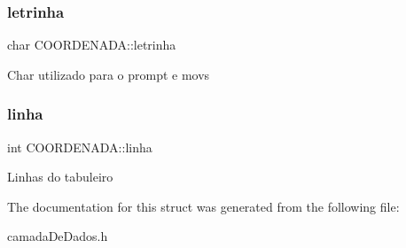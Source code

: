 \subsubsection{\texorpdfstring{letrinha}{letrinha}}
{\footnotesize\ttfamily char C\+O\+O\+R\+D\+E\+N\+A\+D\+A\+::letrinha}

Char utilizado para o prompt e movs \mbox{\label{structCOORDENADA_aefe14bcc5a066ac3b21500cc3d28c06f}} 
\subsubsection{\texorpdfstring{linha}{linha}}
{\footnotesize\ttfamily int C\+O\+O\+R\+D\+E\+N\+A\+D\+A\+::linha}

Linhas do tabuleiro 

The documentation for this struct was generated from the following file\+:\begin{DoxyCompactItemize}
\item 
camada\+De\+Dados.\+h\end{DoxyCompactItemize}
